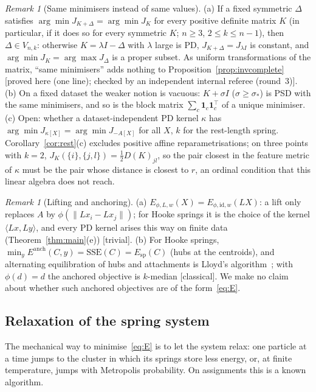 \documentclass[11pt,a4paper]{article}
\theoremstyle{plain}
\theoremstyle{definition}
\theoremstyle{remark}
\newtheorem{remark}[theorem]{Remark}
\newcommand{\SSE}{\mathrm{SSE}}
\newcommand{\spec}{\mathrm{sp}}
\newcommand{\one}{\mathbf 1}
\newcommand{\status}[1]{\textsf{\small [#1]}}
\newcommand{\rthree}{checked by an independent internal referee (round~3)}
\begin{document}
\begin{remark}[Same minimisers instead of same values]\label{rem:argmin}
(a) If a fixed symmetric $\Delta$ satisfies $\arg\min J_{K+\Delta}=\arg\min J_K$ for every positive definite matrix $K$ (in particular, if it does so for every symmetric $K$; $n\ge3$, $2\le k\le n-1$), then $\Delta\in V_{n,k}$: otherwise $K=\lambda I-\Delta$ with $\lambda$ large is PD, $J_{K+\Delta}=J_{\lambda I}$ is constant, and $\arg\min J_K=\arg\max J_\Delta$ is a proper subset. As uniform transformations of the matrix, ``same minimisers'' adds nothing to Proposition~\ref{prop:invcomplete} \status{proved here (one line); \rthree}. (b) On a fixed dataset the weaker notion is vacuous: $K+\sigma I$ ($\sigma\ge\sigma_*$) is PSD with the same minimisers, and so is the block matrix $\sum_c\one_c\one_c^{\!\top}$ of a unique minimiser. (c) Open: whether a dataset-independent PD kernel $\kappa$ has $\arg\min J_{\kappa[X]}=\arg\min J_{-A[X]}$ for all $X$, $k$ for the rest-length spring. Corollary~\ref{cor:rest}(c) excludes positive affine reparametrisations; on three points with $k=2$, $J_K(\{i\},\{j,l\})=\tfrac12D(K)_{jl}$, so the pair closest in the feature metric of $\kappa$ must be the pair whose distance is closest to $r$, an ordinal condition that this linear algebra does not reach.
\end{remark}

\begin{remark}[Lifting and anchoring]\label{rem:lift}
(a) $E_{\phi,L,w}(X)=E_{\phi,\mathrm{id},w}(LX)$: a lift only replaces $A$ by $\phi(\lVert Lx_i-Lx_j\rVert)$; for Hooke springs it is the choice of the kernel $\langle Lx,Ly\rangle$, and every PD kernel arises this way on finite data (Theorem~\ref{thm:main}(e)) \status{trivial}. (b) For Hooke springs, $\min_y E^{\mathrm{anch}}(C,y)=\SSE(C)=E_\spec(C)$ (hubs at the centroids), and alternating equilibration of hubs and attachments is Lloyd's algorithm~\citep{lloyd1982}; with $\phi(d)=d$ the anchored objective is $k$-median \status{classical}. We make no claim about whether such anchored objectives are of the form~\eqref{eq:E}.
\end{remark}

\subsection{Relaxation of the spring system}

The mechanical way to minimise~\eqref{eq:E} is to let the system relax: one particle at a time jumps to the cluster in which its springs store less energy, or, at finite temperature, jumps with Metropolis probability. On assignments this is a known algorithm.
\end{document}
